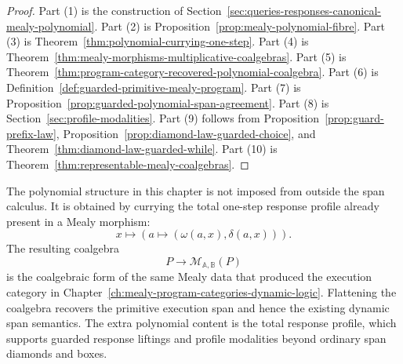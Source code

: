 \begin{proof}
Part (1) is the construction of
Section~\ref{sec:queries-responses-canonical-mealy-polynomial}. Part (2)
is Proposition~\ref{prop:mealy-polynomial-fibre}. Part (3) is
Theorem~\ref{thm:polynomial-currying-one-step}. Part (4) is
Theorem~\ref{thm:mealy-morphisms-multiplicative-coalgebras}. Part (5) is
Theorem~\ref{thm:program-category-recovered-polynomial-coalgebra}. Part
(6) is Definition~\ref{def:guarded-primitive-mealy-program}. Part (7) is
Proposition~\ref{prop:guarded-polynomial-span-agreement}. Part (8) is
Section~\ref{sec:profile-modalities}. Part (9) follows from
Proposition~\ref{prop:guard-prefix-law},
Proposition~\ref{prop:diamond-law-guarded-choice}, and
Theorem~\ref{thm:diamond-law-guarded-while}. Part (10) is
Theorem~\ref{thm:representable-mealy-coalgebras}.
\end{proof}

\begin{remark}
\label{rem:final-polynomial-guarded-summary}
The polynomial structure in this chapter is not imposed from outside the
span calculus. It is obtained by currying the total one-step response
profile already present in a Mealy morphism:
\[
x
\longmapsto
\left(
a
\longmapsto
(\omega(a,x),\delta(a,x))
\right).
\]
The resulting coalgebra
\[
P\to\mathcal M_{\mathbb A,\mathbb B}(P)
\]
is the coalgebraic form of the same Mealy data that produced the execution
category in Chapter~\ref{ch:mealy-program-categories-dynamic-logic}.
Flattening the coalgebra recovers the primitive execution span and hence
the existing dynamic span semantics. The extra polynomial content is the
total response profile, which supports guarded response liftings and
profile modalities beyond ordinary span diamonds and boxes.
\end{remark}